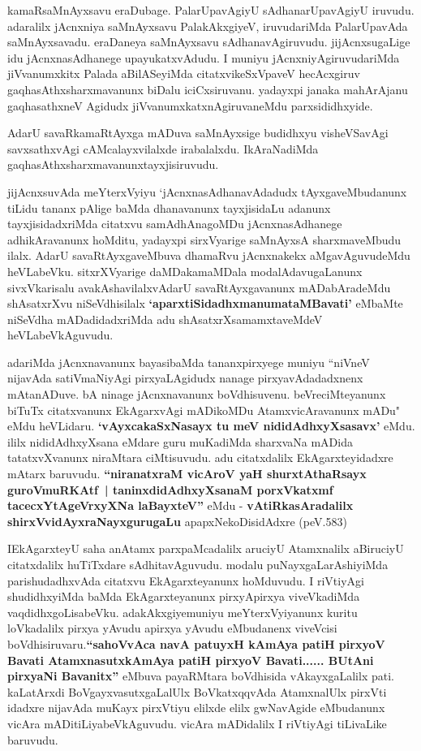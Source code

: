\begin{artha}
kamaRsaMnAyxsavu eraDubage. PalarUpavAgiyU sAdhanarUpavAgiyU
iruvudu. adaralilx jAcnxniya saMnAyxsavu PalakAkxgiyeV, iruvudariMda
PalarUpavAda saMnAyxsavadu. eraDaneya saMnAyxsavu
sAdhanavAgiruvudu. jijAcnxsugaLige idu jAcnxnasAdhanege
upayukatxvAdudu. I muniyu jAcnxniyAgiruvudariMda jiVvanumxkitx Palada aBilASeyiMda citatxvikeSxVpaveV hecAcxgiruv gaqhasAthxsharxmavanunx biDalu iciCxsiruvanu. yadayxpi janaka mahArAjanu gaqhasathxneV Agidudx
jiVvanumxkatxnAgiruvaneMdu parxsididhxyide. 

AdarU savaRkamaRtAyxga mADuva saMnAyxsige budidhxyu visheVSavAgi\break
savxsathxvAgi cAMcalayxvilalxde irabalalxdu. IkAraNadiMda
gaqhasAthxsharxmavanunx\break tayxjisiruvudu.

jijAcnxsuvAda meYterxVyiyu `jAcnxnasAdhanavAdadudx tAyxgaveMbudanunx
tiLidu tananx pAlige baMda dhanavanunx tayxjisidaLu adanunx
tayxjisidadxriMda citatxvu samAdhAnagoMDu jAcnxnasAdhanege
adhikAravanunx hoMditu, yadayxpi sirxVyarige saMnAyxsA sharxmaveMbudu
ilalx. AdarU savaRtAyxgaveMbuva dhamaRvu jAcnxnakekx aMgavAguvudeMdu
heVLabeVku. sitxrXVyarige daMDakamaMDala modalAdavugaLanunx
sivxVkarisalu avakAshavilalxvAdarU savaRtAyxgavanunx mADabAradeMdu
shAsatxrXvu niSeVdhisilalx \textbf{`aparxtiSidadhxmanumataMBavati'} eMbaMte niSeVdha mADadidadxriMda
adu shAsatxrXsamamxtaveMdeV heVLabeVkAguvudu.

adariMda  jAcnxnavanunx bayasibaMda tananxpirxyege muniyu ``niVneV nijavAda satiVmaNiyAgi pirxyaLAgidudx nanage
pirxyavAdadadxnenx mAtanADuve. bA ninage jAcnxnavanunx
boVdhisuvenu. beVreciMteyanunx biTuTx citatxvanunx EkAgarxvAgi
mADikoMDu AtamxvicAravanunx mADu" eMdu heVLidaru. \textbf{`vAyxcakaSxNasayx tu meV nididAdhxyXsasavx'} eMdu. ililx
nididAdhxyXsana eMdare guru muKadiMda sharxvaNa mADida tatatxvXvanunx
niraMtara ciMtisuvudu. adu citatxdalilx EkAgarxteyidadxre mAtarx
baruvudu. \textbf{``niranatxraM vicAroV yaH shurxtAthaRsayx guroVmuRKAtf~| taninxdidAdhxyXsanaM porxVkatxmf tacecxYtAgeVrxyXNa laBayxteV''} eMdu - \textbf{vAtiRkasAradalilx}\textbf{ shirxVvidAyxraNayxgurugaLu} 
apapxNekoDisidAdxre (peV.583)
\end{artha}

\begin{artha}
IEkAgarxteyU saha anAtamx parxpaMcadalilx aruciyU Atamxnalilx
aBiruciyU citatxdalilx huTiTxdare sAdhitavAguvudu. modalu
puNayxgaLarAshiyiMda parishudadhxvAda citatxvu EkAgarxteyanunx
hoMduvudu. I riVtiyAgi shudidhxyiMda baMda EkAgarxteyanunx
pirxyApirxya viveVkadiMda vaqdidhxgoLisabeVku. adakAkxgiye\break muniyu
meYterxVyiyanunx kuritu loVkadalilx pirxya yAvudu apirxya yAvudu
eMbudanenx viveVcisi boVdhisiruvaru.\textbf{``sahoVvAca navA patuyxH kAmAya patiH pirxyoV Bavati AtamxnasutxkAmAya patiH pirxyoV Bavati...... BUtAni pirxyaNi Bavanitx''} eMbuva payaRMtara
boVdhisida vAkayxgaLalilx pati. kaLatArxdi BoVgayxvasutxgaLalUlx
BoVkatxqqvAda AtamxnalUlx pirxVti idadxre nijavAda muKayx pirxVtiyu
elilxde elilx gwNavAgide eMbudanunx vicAra
mADitiLiyabeVkAguvudu. vicAra mADidalilx I riVtiyAgi tiLivaLike baruvudu.
\end{artha}


